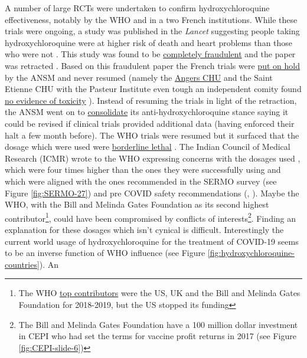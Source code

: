 \documentclass[11pt,a4paper,notitlepage]{report}
\begin{document}
A number of large RCTs were undertaken to confirm hydroxychloroquine effectiveness, notably by the WHO and in a two French institutions. While these trials were ongoing, a study was published in the \textit{Lancet} suggesting people taking hydroxychloroquine were at higher risk of death and heart problems than those who were not \cite{mehra2020}. This study was found to be \href{https://www.theguardian.com/world/2020/jun/03/covid-19-surgisphere-who-world-health-organization-hydroxychloroquine}{completely fraudulent} \cite{guardian03062020b} and the paper was retracted \cite{guardian03062020}. Based on this fraudulent paper the French trials were \href{https://ansm.sante.fr/actualites/covid-19-lansm-souhaite-suspendre-par-precaution-les-essais-cliniques-evaluant-lhydroxychloroquine-dans-la-prise-en-charge-des-patients}{put on hold} by the ANSM and never resumed \cite{ansm26052020} (namely the \href{https://www.ouest-france.fr/sante/virus/coronavirus/coronavirus-au-chu-d-angers-l-etude-scientifique-hycovid-prend-fin-6873758}{Angers CHU} \cite{ouestfrance18062020} and the Saint Etienne CHU with the Pasteur Institute even tough an independent comity found \href{https://www.pasteur.fr/fr/espace-presse/documents-presse/covidaxis-essai-clinique-prevention-du-covid-19-soignants}{no evidence of toxicity} \cite{pasteur10042020}). Instead of resuming the trials in light of the retraction, the ANSM went on to \href{https://ansm.sante.fr/actualites/lansm-publie-sa-decision-sur-la-demande-dune-rtu-pour-lhydroxychloroquine-dans-la-prise-en-charge-de-la-maladie-covid-19}{consolidate} its anti-hydroxychloroquine stance \cite{ansm23102020} saying it could be revised if clinical trials provided additional data (having enforced their halt a few month before). The WHO trials were resumed but it surfaced that the dosage which were used were \href{https://www.francesoir.fr/politique-monde/oxford-recovery-et-solidarity-overdosage-two-clinical-trials-acts-considered}{borderline lethal} \cite{francesoir25062020}. The Indian Council of Medical Research (ICMR) wrote to the WHO expressing concerns with the dosages used \cite{newindianexpress29052020}, which were four times higher than the ones they were successfully using and which were aligned with the ones recommended in the SERMO survey (see Figure \ref{fig:SERMO-27}) and pre COVID safety recommendations (\cite{Shippey459}, \cite{lupus20092017}). Maybe the WHO, with the Bill and Melinda Gates Foundation as its second highest contributor\footnote{The WHO \href{https://www.who.int/about/funding/contributors}{top contributors} \cite{who-contributors2020} were the US, UK and the Bill and Melinda Gates Foundation for 2018-2019, but the US stopped its funding}, could have been compromised by conflicts of interests\footnote{The Bill and Melinda Gates Foundation have a 100 million dollar investment in CEPI who had set the terms for vaccine profit returns in 2017 (see Figure \ref{fig:CEPI-slide-6})}. Finding an explanation for these dosages which isn't cynical is difficult. Interestingly the current world usage of hydroxychloroquine for the treatment of COVID-19 seems to be an inverse function of WHO influence (see Figure \ref{fig:hydroxychloroquine-countries}). An 
\end{document}
